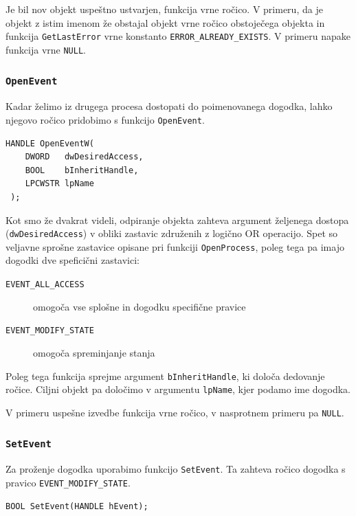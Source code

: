 \documentclass[a4paper,12pt,openright]{book}
\begin{document}
Je bil nov objekt uspeštno ustvarjen, funkcija vrne ročico.
V primeru, da je objekt z istim imenom že obstajal objekt vrne ročico obstoječega objekta in funkcija \texttt{GetLastError} vrne konstanto \texttt{ERROR\_ALREADY\_EXISTS}.
V primeru napake funkcija vrne \texttt{NULL}.

\subsubsection{\texttt{OpenEvent}}

Kadar želimo iz drugega procesa dostopati do poimenovanega dogodka, lahko njegovo ročico pridobimo s funkcijo \texttt{OpenEvent}.

\begin{lstlisting}[style=func]
 HANDLE OpenEventW(
	DWORD   dwDesiredAccess,
	BOOL    bInheritHandle,
	LPCWSTR lpName
 );
\end{lstlisting}

Kot smo že dvakrat videli, odpiranje objekta zahteva argument željenega dostopa (\texttt{dwDesiredAccess}) v obliki zastavic združenih z logično OR operacijo.
Spet so veljavne sprošne zastavice opisane pri funkciji \texttt{OpenProcess}, poleg tega pa imajo dogodki dve speficični zastavici:
\begin{description}
	\item[\texttt{EVENT\_ALL\_ACCESS}] omogoča vse splošne in dogodku specifične pravice
	\item[\texttt{EVENT\_MODIFY\_STATE}] omogoča spreminjanje stanja
\end{description}

Poleg tega funkcija sprejme argument \texttt{bInheritHandle}, ki določa dedovanje ročice.
Ciljni objekt pa določimo v argumentu \texttt{lpName}, kjer podamo ime dogodka.

V primeru uspešne izvedbe funkcija vrne ročico, v nasprotnem primeru pa \texttt{NULL}.

\subsubsection{\texttt{SetEvent}}

Za proženje dogodka uporabimo funkcijo \texttt{SetEvent}.
Ta zahteva ročico dogodka s pravico \texttt{EVENT\_MODIFY\_STATE}.

\begin{lstlisting}[style=func]
 BOOL SetEvent(HANDLE hEvent);
\end{lstlisting}
\end{document}
